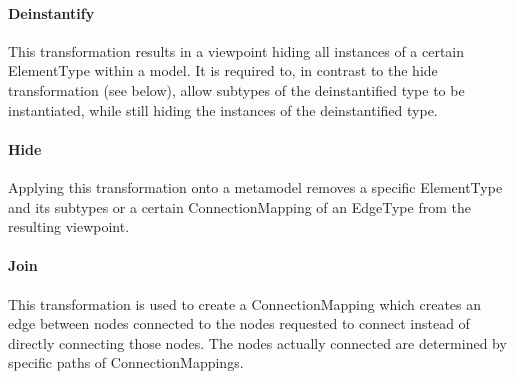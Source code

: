 \paragraph{Deinstantify} This transformation results in a viewpoint hiding all instances of a certain ElementType within a model. It is required to, in contrast to the hide transformation (see below), allow subtypes of the deinstantified type to be instantiated, while still hiding the instances of the deinstantified type.

\paragraph{Hide} Applying this transformation onto a metamodel removes a specific ElementType and its subtypes or a certain ConnectionMapping of an EdgeType from the resulting viewpoint.

\paragraph{Join} This transformation is used to create a ConnectionMapping which creates an edge between nodes connected to the nodes requested to connect instead of directly connecting those nodes. The nodes actually connected are determined by specific paths of ConnectionMappings.


